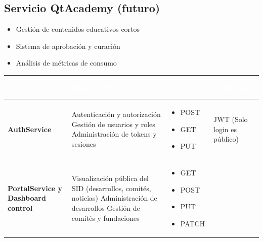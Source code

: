 \documentclass[11pt,a4paper]{article}
\newcommand{\headerStyle}[1]{\textcolor{white}{\textbf{#1}}}
\begin{document}
\subsection{Servicio QtAcademy (futuro)}
\begin{itemize}
	\item Gestión de contenidos educativos cortos
	\item Sistema de aprobación y curación
	\item Análisis de métricas de consumo
\end{itemize}


\begin{table}[H]
	\centering
	\renewcommand{\arraystretch}{1.5}
	\begin{tabular}{>{\raggedright\arraybackslash}p{2.8cm} >{\raggedright\arraybackslash}p{5.0cm} >{\raggedright\arraybackslash}p{3.0cm} >{\raggedright\arraybackslash}p{3.0cm}}
		\toprule
		\rowcolor{headercolor}
		\headerStyle{M{\'o}dulo}                   & \headerStyle{Función principal} & \headerStyle{Métodos API} & \headerStyle{Seguridad} \\
		\midrule
		\rowcolor{rowcolor1}
		\textbf{AuthService}                       &
		Autenticación y autorización\newline
		Gestión de usuarios y roles\newline
		Administración de tokens y sesiones        &
		\begin{itemize}[nosep,leftmargin=*]
			\item POST
			\item GET
			\item PUT
		\end{itemize}        &
		JWT\newline
		(Solo login es público)                                                                                                            \\
		\midrule
		\rowcolor{rowcolor2}
		\textbf{PortalService y Dashboard control} &
		Visualización pública del SID\newline
		(desarrollos, comités, noticias)\newline
		Administración de desarrollos\newline
		Gestión de comités y fundaciones           &
		\begin{itemize}[nosep,leftmargin=*]
			\item GET
			\item POST
			\item PUT
			\item PATCH

\end{itemize}
\end{tabular}
\end{table}
\end{document}
